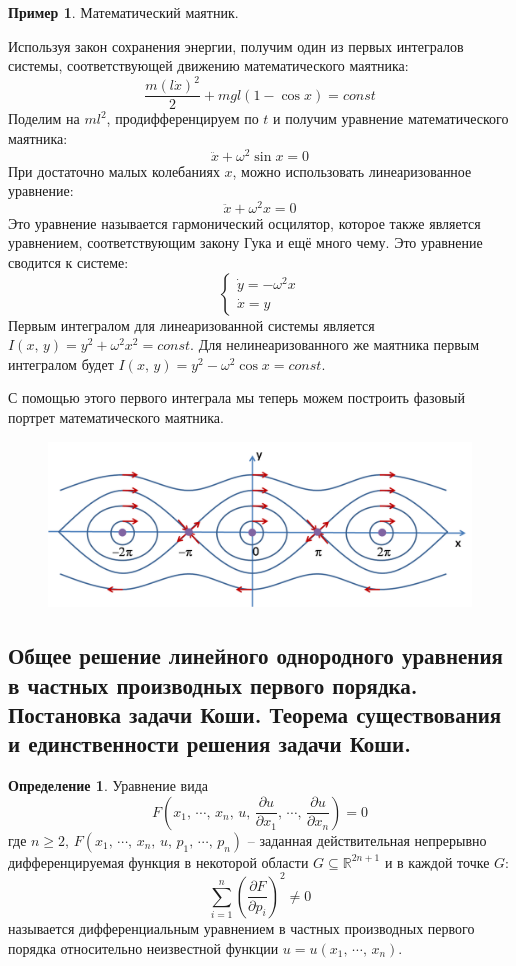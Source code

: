 \documentclass[a4paper,12pt]{article}
\renewcommand{\geq}{\ensuremath{\geqslant}}
\theoremstyle{plain}
\theoremstyle{definition}
\newtheorem{definition}{Определение}[section]
\newtheorem*{example}{Пример}
\theoremstyle{remark}
\begin{document}
\newpage
\begin{example}
	Математический маятник.

	Используя закон сохранения энергии, получим один из первых интегралов системы, соответствующей движению математического маятника:
	\[\frac{m(l\dot{x})^2}{2} + mgl(1 - \cos x) = const\]
	Поделим на $ml^2$, продифференцируем по $t$ и получим уравнение математического маятника:
	\[\ddot{x} + \omega^2\sin x = 0\]
	При достаточно малых колебаниях $x$, можно использовать линеаризованное уравнение:
	\[\ddot{x} + \omega^2x = 0\]
	Это уравнение называется гармонический осцилятор, которое также является уравнением, соответствующим закону Гука и ещё много чему.
	Это уравнение сводится к системе:
	\[
		\begin{cases}
			\dot{y} = -\omega^2x \\
			\dot{x} = y
		\end{cases}
	\]
	Первым интегралом для линеаризованной системы является $I(x,\,y) = y^2 + \omega^2x^2 = const$. Для нелинеаризованного же маятника первым интегралом будет $I(x,\,y) = y^2 - \omega^2\cos x = const$.

	С помощью этого первого интеграла мы теперь можем построить фазовый портрет математического маятника.
	\begin{figure}[h]
		\includegraphics[scale = 0.7]{img/oscilator.png}
	\end{figure}
\end{example}

\subsection{Общее решение линейного однородного уравнения в частных производных первого порядка. Постановка задачи Коши. Теорема существования и единственности решения задачи Коши.}
\begin{definition}
	Уравнение вида
	\[F\left(x_1,\,\cdots,\,x_n,\, u,\, \frac{\partial u}{\partial x_1},\,\cdots,\,\frac{\partial u}{\partial x_n}\right) = 0\]
	где $n \geq 2,\, F(x_1,\,\cdots,\,x_n,\,u,\,p_1,\,\cdots,\,p_n)$ -- заданная действительная непрерывно дифференцируемая функция в некоторой области $G \subseteq \mathbb{R}^{2n + 1}$ и в каждой точке $G$:
	\[\sum_{i = 1}^n \left(\frac{\partial F}{\partial p_i}\right)^2 \neq 0\]
	называется дифференциальным уравнением в частных производных первого порядка относительно неизвестной функции $u = u(x_1,\,\cdots,\,x_n)$.
\end{definition}
\end{document}
